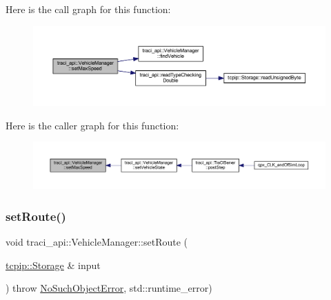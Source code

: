 Here is the call graph for this function\+:
\nopagebreak
\begin{figure}[H]
\begin{center}
\leavevmode
\includegraphics[width=350pt]{classtraci__api_1_1_vehicle_manager_a5bd46032db2b057eb7e5a5c61d043827_cgraph}
\end{center}
\end{figure}
Here is the caller graph for this function\+:
\nopagebreak
\begin{figure}[H]
\begin{center}
\leavevmode
\includegraphics[width=350pt]{classtraci__api_1_1_vehicle_manager_a5bd46032db2b057eb7e5a5c61d043827_icgraph}
\end{center}
\end{figure}
\mbox{\label{classtraci__api_1_1_vehicle_manager_a30063f71f02a6272244d7d1e1e9ec99d}} 
\subsubsection{\texorpdfstring{set\+Route()}{setRoute()}}
{\footnotesize\ttfamily void traci\+\_\+api\+::\+Vehicle\+Manager\+::set\+Route (\begin{DoxyParamCaption}\item[{\hyperlink{classtcpip_1_1_storage}{tcpip\+::\+Storage} \&}]{input }\end{DoxyParamCaption}) throw  \hyperlink{classtraci__api_1_1_no_such_object_error}{No\+Such\+Object\+Error}, std\+::runtime\+\_\+error) }

